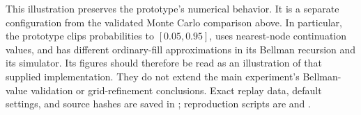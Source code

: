 This illustration preserves the prototype's numerical behavior. It is a
separate configuration from the validated Monte Carlo comparison above. In
particular, the prototype clips probabilities to $[0.05,0.95]$, uses nearest-node
continuation values, and has different ordinary-fill approximations in its
Bellman recursion and its simulator. Its figures should therefore be read as
an illustration of that supplied implementation. They do not extend the main
experiment's Bellman-value validation or grid-refinement conclusions.
Exact replay data, default settings, and source hashes are saved in
; reproduction scripts are
 and
.
